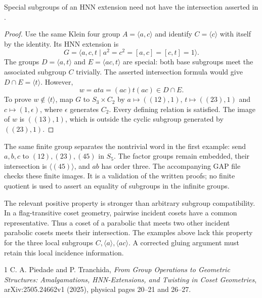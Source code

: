 \begin{proposition}\label{prop:hnn}
Special subgroups of an HNN extension need not have the intersection
asserted in \cite[Lemma 3.29(a)]{PT}.
\end{proposition}
\begin{proof}
Use the same Klein four group $A=\langle a,c\rangle$ and identify
$C=\langle c\rangle$ with itself by the identity. Its HNN extension is
\[
 G=\langle a,c,t\mid a^2=c^2=[a,c]=[c,t]=1\rangle.
\]
The groups $D=\langle a,t\rangle$ and $E=\langle ac,t\rangle$ are
special: both base subgroups meet the associated subgroup $C$ trivially.
The asserted intersection formula would give $D\cap E=\langle t\rangle$.
However,
\[
 w=ata=(ac)t(ac)\in D\cap E.
\]
To prove $w\notin\langle t\rangle$, map $G$ to $S_3\times C_2$ by
$a\mapsto((12),1)$, $t\mapsto((23),1)$ and
$c\mapsto(1,\epsilon)$, where $\epsilon$ generates $C_2$.
Every defining relation is satisfied. The image of $w$ is $((13),1)$,
which is outside the cyclic subgroup generated by $((23),1)$.
\end{proof}

The same finite group separates the nontrivial word in the first example:
send $a,b,c$ to $(12),(23),(45)$ in $S_5$. The factor groups remain
embedded, their intersection is $\langle(45)\rangle$, and $ab$ has order
three. The accompanying GAP file checks these finite images. It is a
validation of the written proofs; no finite quotient is used to assert
an equality of subgroups in the infinite groups.

The relevant positive property is stronger than arbitrary subgroup
compatibility. In a flag-transitive coset geometry, pairwise incident
cosets have a common representative. Thus a coset of a parabolic that
meets two other incident parabolic cosets meets their intersection.
The examples above lack this property for the three local subgroups
$C,\langle a\rangle,\langle ac\rangle$. A corrected gluing argument
must retain this local incidence information.

\begin{thebibliography}{1}
 C. A. Piedade and P. Tranchida,
\emph{From Group Operations to Geometric Structures: Amalgamations,
HNN-Extensions, and Twisting in Coset Geometries},
arXiv:2505.24662v1 (2025), physical pages 20--21 and 26--27.
\end{thebibliography}

